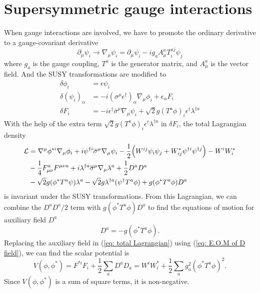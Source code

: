 \documentclass[12pt]{report}
\begin{document}
\section{Supersymmetric gauge interactions}
When gauge interactions are involved, we have to promote the ordinary derivative to a gauge-covariant derivative
\begin{equation}
\partial_{\mu} \psi_{i} \to \nabla_{\mu} \psi_{i} = \partial_{\mu} \psi_{i} - i g_{a} A^{a}_{\mu} T^{aj}_{i} \psi_{j}
\end{equation}
where $g_{a}$ is the gauge coupling, $T^{a}$ is the generator matrix, and $A^{a}_{\mu}$ is the vector field.
And the SUSY transformations are modified to
\begin{align} \label{eq: total Lagrangian}
\delta \phi_{i} &= \epsilon \psi_{i}\\
\delta (\psi_{i})_{\alpha} &= - i (\sigma^{\mu} \epsilon^{\dag})_{\alpha} \nabla_{\mu} \phi_{i} + \epsilon_{\alpha} F_{i}\\
\delta F_{i} &= -i \epsilon^{\dag} \overline{\sigma}^{\mu} \nabla_{\mu} \psi_{i} + \sqrt{2} g (T^{a} \phi)_{i} \epsilon^{\dag} \lambda^{\dag a}
\end{align}
With the help of the extra term $\sqrt{2} g (T^{a} \phi)_{i} \epsilon^{\dag} \lambda^{\dag a}$ in $\delta F_{i}$, the total Lagrangian density
\begin{align} \label{eq: Lagrangian for gauge theory}
\mathcal{L} &= \nabla^{\mu} \phi^{*i} \nabla_{\mu} \phi_{i} + i \psi^{\dag i} \overline{\sigma}^{\mu} \nabla_{\mu} \psi_{i} -\frac{1}{2} \Big( W^{ij} \psi_{i} \psi_{j} + W^{*}_{ij} \psi^{\dag i} \psi^{\dag j} \Big) - W^{i} W^{*}_{i} \notag \\
& -\frac{1}{4} F^{a}_{\mu \nu} F^{\mu \nu a} + i \lambda^{\dag a} \overline{\sigma}^{\mu} \nabla_{\mu} \lambda^{a} + \frac{1}{2} D^{a} D^{a} \notag \\
& -\sqrt{2} g (\phi^{*} T^{a} \psi) \lambda^{a} - \sqrt{2} g \lambda^{\dag a} (\psi^{\dag} T^{a} \phi) + g(\phi^{*} T^{a} \phi) D^{a}
\end{align}
is invariant under the SUSY transformations.
From this Lagrangian, we can combine the $D^{a} D^{a} / 2$ term with $g (\phi^{*} T^{a} \phi) D^{a}$ to find the equations of motion for auxiliary field $D^{a}$
\begin{equation} \label{eq: E.O.M of D field}
D^{a} = - g (\phi^{*} T^{a} \phi) .
\end{equation}
Replacing the auxiliary field in (\ref{eq: total Lagrangian}) using (\ref{eq: E.O.M of D field}), we can find the scalar potential is
\begin{equation} \label{eq: scalar potential}
V(\phi, \phi^{*}) = F^{*i} F_{i} + \frac{1}{2} \sum_{a} D^{a} D_{a} = W^{i} W^{*}_{i} + \frac{1}{2} \sum_{a} g^{2}_{a} (\phi^{*} T^{a} \phi)^{2} .
\end{equation}
Since $V(\phi, \phi^{*})$ is a sum of square terms, it is non-negative.
\end{document}

